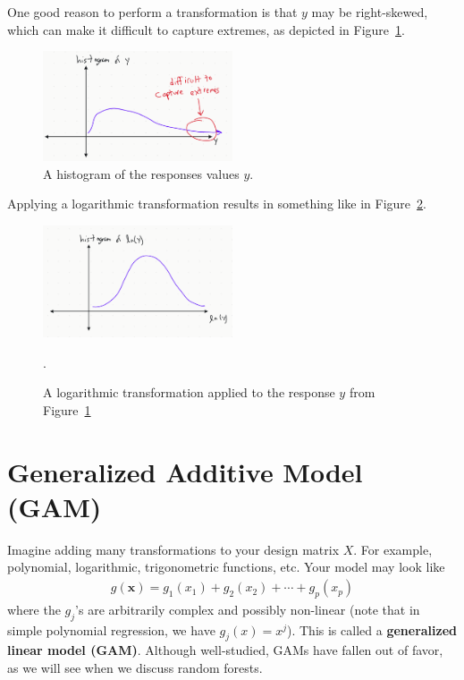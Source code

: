 \documentclass[12pt, a4paper]{article}
\theoremstyle{definition}
\begin{document}
	One good reason to perform a transformation is that $y$ may be right-skewed,
	which can make it difficult to capture extremes, as depicted in
	Figure~\ref{fig:histogram-y-difficult-capturing-extremes}.
	\begin{figure}
		\centering
		\includegraphics[width=0.5\textwidth]{histogram-y-capturing-extremes}
		\caption{A histogram of the responses values $y$.}
		\label{fig:histogram-y-difficult-capturing-extremes}
	\end{figure}
	
	Applying a logarithmic transformation results in something like in
	Figure~\ref{fig:log-transformation-histogram-y}.
	\begin{figure}
		\centering
		\includegraphics[width=0.5\textwidth]{log-transformation-histogram-y}
		\caption{A logarithmic transformation applied to the response $y$
		from Figure~\ref{fig:histogram-y-difficult-capturing-extremes}}.
		\label{fig:log-transformation-histogram-y}
	\end{figure}
	\section*{Generalized Additive Model (GAM)}
	Imagine adding many transformations to your design matrix $X$. For example,
	polynomial, logarithmic, trigonometric functions, etc. Your model may look
	like
	\begin{align*}
		g(\bm{x}) = g_1(x_1) + g_2(x_2) +\cdots+g_p(x_p)
	\end{align*}
	where the $g_j$'s are arbitrarily complex and possibly non-linear (note that
	in simple polynomial regression, we have $g_j(x)=x^j$). This is called a
	\textbf{generalized linear model (GAM)}. Although well-studied, GAMs have
	fallen out of favor, as we will see when we discuss random forests.
	
\end{document}
